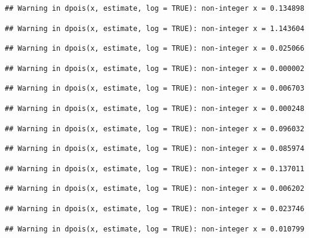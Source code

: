\documentclass[]{article}
\begin{document}
\begin{verbatim}
## Warning in dpois(x, estimate, log = TRUE): non-integer x = 0.134898
\end{verbatim}

\begin{verbatim}
## Warning in dpois(x, estimate, log = TRUE): non-integer x = 1.143604
\end{verbatim}

\begin{verbatim}
## Warning in dpois(x, estimate, log = TRUE): non-integer x = 0.025066
\end{verbatim}

\begin{verbatim}
## Warning in dpois(x, estimate, log = TRUE): non-integer x = 0.000002
\end{verbatim}

\begin{verbatim}
## Warning in dpois(x, estimate, log = TRUE): non-integer x = 0.006703
\end{verbatim}

\begin{verbatim}
## Warning in dpois(x, estimate, log = TRUE): non-integer x = 0.000248
\end{verbatim}

\begin{verbatim}
## Warning in dpois(x, estimate, log = TRUE): non-integer x = 0.096032
\end{verbatim}

\begin{verbatim}
## Warning in dpois(x, estimate, log = TRUE): non-integer x = 0.085974
\end{verbatim}

\begin{verbatim}
## Warning in dpois(x, estimate, log = TRUE): non-integer x = 0.137011
\end{verbatim}

\begin{verbatim}
## Warning in dpois(x, estimate, log = TRUE): non-integer x = 0.006202
\end{verbatim}

\begin{verbatim}
## Warning in dpois(x, estimate, log = TRUE): non-integer x = 0.023746
\end{verbatim}

\begin{verbatim}
## Warning in dpois(x, estimate, log = TRUE): non-integer x = 0.010799
\end{verbatim}
\end{document}
